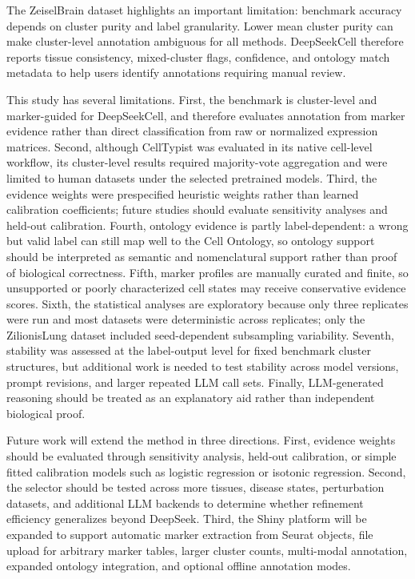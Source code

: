 \documentclass[referee,lineno,pdflatex]{sn-jnl}
\begin{document}
The ZeiselBrain dataset highlights an important limitation: benchmark accuracy depends on cluster purity and label granularity. Lower mean cluster purity can make cluster-level annotation ambiguous for all methods. DeepSeekCell therefore reports tissue consistency, mixed-cluster flags, confidence, and ontology match metadata to help users identify annotations requiring manual review.

This study has several limitations. First, the benchmark is cluster-level and marker-guided for DeepSeekCell, and therefore evaluates annotation from marker evidence rather than direct classification from raw or normalized expression matrices. Second, although CellTypist was evaluated in its native cell-level workflow, its cluster-level results required majority-vote aggregation and were limited to human datasets under the selected pretrained models. Third, the evidence weights were prespecified heuristic weights rather than learned calibration coefficients; future studies should evaluate sensitivity analyses and held-out calibration. Fourth, ontology evidence is partly label-dependent: a wrong but valid label can still map well to the Cell Ontology, so ontology support should be interpreted as semantic and nomenclatural support rather than proof of biological correctness. Fifth, marker profiles are manually curated and finite, so unsupported or poorly characterized cell states may receive conservative evidence scores. Sixth, the statistical analyses are exploratory because only three replicates were run and most datasets were deterministic across replicates; only the ZilionisLung dataset included seed-dependent subsampling variability. Seventh, stability was assessed at the label-output level for fixed benchmark cluster structures, but additional work is needed to test stability across model versions, prompt revisions, and larger repeated LLM call sets. Finally, LLM-generated reasoning should be treated as an explanatory aid rather than independent biological proof.

Future work will extend the method in three directions. First, evidence weights should be evaluated through sensitivity analysis, held-out calibration, or simple fitted calibration models such as logistic regression or isotonic regression. Second, the selector should be tested across more tissues, disease states, perturbation datasets, and additional LLM backends to determine whether refinement efficiency generalizes beyond DeepSeek. Third, the Shiny platform will be expanded to support automatic marker extraction from Seurat objects, file upload for arbitrary marker tables, larger cluster counts, multi-modal annotation, expanded ontology integration, and optional offline annotation modes.
\end{document}
